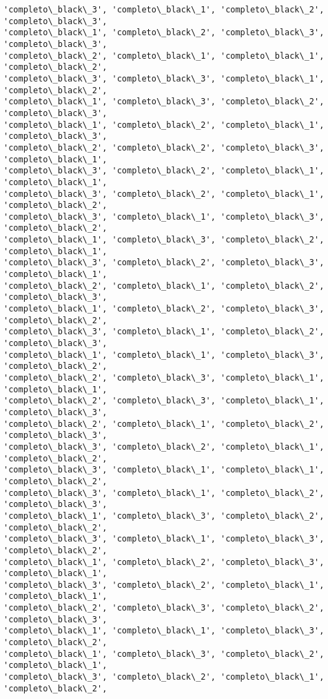 \documentclass[11pt]{article}
\begin{document}
\begin{Verbatim}[commandchars=\\\{\}]
'completo\_black\_3', 'completo\_black\_1', 'completo\_black\_2', 'completo\_black\_3',
'completo\_black\_1', 'completo\_black\_2', 'completo\_black\_3', 'completo\_black\_3',
'completo\_black\_2', 'completo\_black\_1', 'completo\_black\_1', 'completo\_black\_2',
'completo\_black\_3', 'completo\_black\_3', 'completo\_black\_1', 'completo\_black\_2',
'completo\_black\_1', 'completo\_black\_3', 'completo\_black\_2', 'completo\_black\_3',
'completo\_black\_1', 'completo\_black\_2', 'completo\_black\_1', 'completo\_black\_3',
'completo\_black\_2', 'completo\_black\_2', 'completo\_black\_3', 'completo\_black\_1',
'completo\_black\_3', 'completo\_black\_2', 'completo\_black\_1', 'completo\_black\_1',
'completo\_black\_3', 'completo\_black\_2', 'completo\_black\_1', 'completo\_black\_2',
'completo\_black\_3', 'completo\_black\_1', 'completo\_black\_3', 'completo\_black\_2',
'completo\_black\_1', 'completo\_black\_3', 'completo\_black\_2', 'completo\_black\_1',
'completo\_black\_3', 'completo\_black\_2', 'completo\_black\_3', 'completo\_black\_1',
'completo\_black\_2', 'completo\_black\_1', 'completo\_black\_2', 'completo\_black\_3',
'completo\_black\_1', 'completo\_black\_2', 'completo\_black\_3', 'completo\_black\_2',
'completo\_black\_3', 'completo\_black\_1', 'completo\_black\_2', 'completo\_black\_3',
'completo\_black\_1', 'completo\_black\_1', 'completo\_black\_3', 'completo\_black\_2',
'completo\_black\_2', 'completo\_black\_3', 'completo\_black\_1', 'completo\_black\_1',
'completo\_black\_2', 'completo\_black\_3', 'completo\_black\_1', 'completo\_black\_3',
'completo\_black\_2', 'completo\_black\_1', 'completo\_black\_2', 'completo\_black\_3',
'completo\_black\_3', 'completo\_black\_2', 'completo\_black\_1', 'completo\_black\_2',
'completo\_black\_3', 'completo\_black\_1', 'completo\_black\_1', 'completo\_black\_2',
'completo\_black\_3', 'completo\_black\_1', 'completo\_black\_2', 'completo\_black\_3',
'completo\_black\_1', 'completo\_black\_3', 'completo\_black\_2', 'completo\_black\_2',
'completo\_black\_3', 'completo\_black\_1', 'completo\_black\_3', 'completo\_black\_2',
'completo\_black\_1', 'completo\_black\_2', 'completo\_black\_3', 'completo\_black\_1',
'completo\_black\_3', 'completo\_black\_2', 'completo\_black\_1', 'completo\_black\_1',
'completo\_black\_2', 'completo\_black\_3', 'completo\_black\_2', 'completo\_black\_3',
'completo\_black\_1', 'completo\_black\_1', 'completo\_black\_3', 'completo\_black\_2',
'completo\_black\_1', 'completo\_black\_3', 'completo\_black\_2', 'completo\_black\_1',
'completo\_black\_3', 'completo\_black\_2', 'completo\_black\_1', 'completo\_black\_2',

\end{Verbatim}
\end{document}
